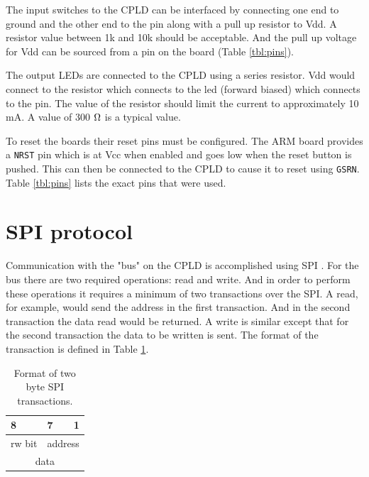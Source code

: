 \documentclass{article}
\begin{document}
The input switches to the CPLD can be interfaced by connecting
one end to ground and the other end to the pin along with a
pull up resistor to Vdd.
A resistor value between 1k and 10k should be acceptable.
And the pull up voltage for Vdd can be sourced from a pin on
the board (Table \ref{tbl:pins}).

The output LEDs are connected to the CPLD using a series
resistor.
Vdd would connect to the resistor which connects to the led
(forward biased) which connects to the pin.
The value of the resistor should limit the current to approximately
10 mA.
A value of 300 $\ohm$ is a typical value.

To reset the boards their reset pins must be configured.
The ARM board provides a \verb+NRST+ pin which is at Vcc
when enabled and goes low when the reset button is pushed\cite[Pg. 17, 20]{UM1079}.
This can then be connected to the CPLD to cause
it to reset using \verb+GSRN+\citetext{\citealp[Pg. 13, 46, 50, 53]{DS1002}; \citealp[Pg. 8]{EB66}}.
Table \ref{tbl:pins} lists the exact pins that were used.

\clearpage


\section{SPI protocol}

Communication with the "bus" on the CPLD is accomplished using SPI
\citetext{ \citealp[Pg. 278]{cady2009microcontrollers}; \citealp[Pg. 665]{STRM0038}}.
For the bus there are two required operations: read and write.
And in order to perform these operations it requires a minimum of
two transactions over the SPI.
A read, for example, would send the address in the first transaction.
And in the second transaction the data read would be returned.
A write is similar except that for the second transaction the
data to be written is sent.
The format of the transaction is defined in Table \ref{tbl:spiformat}.

\begin{table}
\center
\begin{tabular}{|c|c|c|}
    \multicolumn{1}{l}{8} & \multicolumn{1}{l}{7} & \multicolumn{1}{r}{1} \\
\hline
rw bit & \multicolumn{2}{|c|}{address} \\
\hline
\multicolumn{3}{|c|}{data} \\
\hline
\end{tabular}
\caption{Format of two byte SPI transactions.}
\label{tbl:spiformat}
\end{table}
\end{document}
